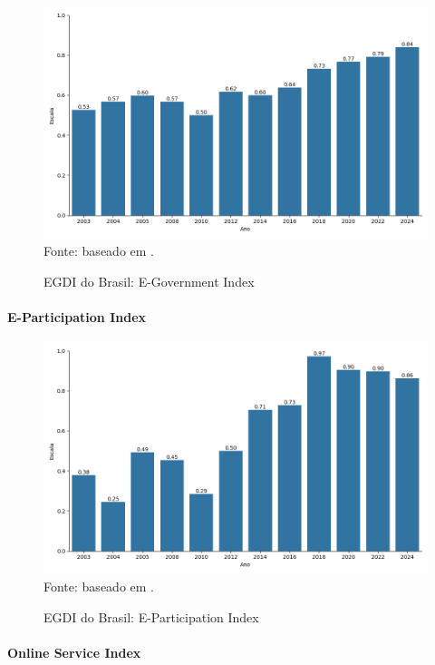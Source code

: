 \begin{figure}[H]
	\centering
	\caption{EGDI do Brasil: E-Government Index}
	\includegraphics[width=1\linewidth]{figuras/egdi/egdi_brasil_egov.png}
	\label{fig:egdi_brasil_egov}
	\footnotesize{Fonte: baseado em \cite{ONU_edgi_mapa}.}
\end{figure}

\paragraph{E-Participation Index}

\begin{figure}[H]
	\centering
	\caption{EGDI do Brasil: E-Participation Index}
	\includegraphics[width=1\linewidth]{figuras/egdi/egdi_brasil_epart.png}
	\label{fig:egdi_brasil_epart}
	\footnotesize{Fonte: baseado em \cite{ONU_edgi_mapa}.}
\end{figure}

\paragraph{Online Service Index}

